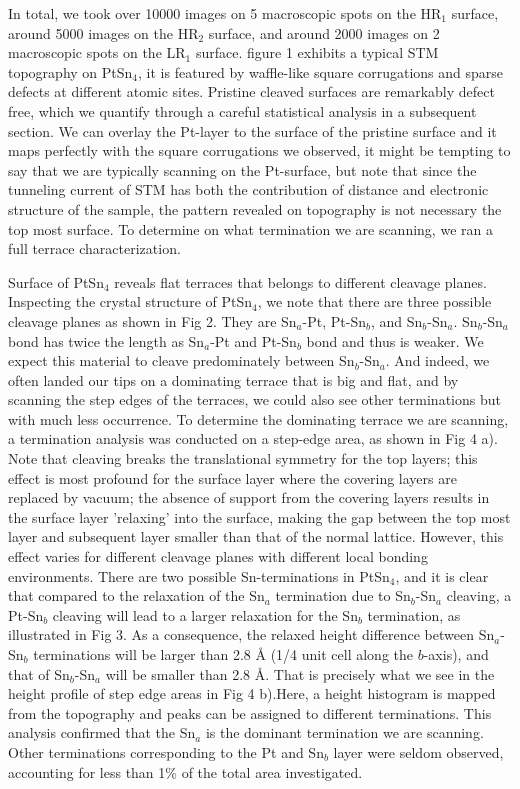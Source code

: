 In total, we took over 10000 images on 5 macroscopic spots on the HR$_1$ surface, around 5000 images on the HR$_2$ surface, and around 2000 images on 2 macroscopic spots on the LR$_1$ surface. 
figure 1 exhibits a typical STM topography on PtSn$_4$, it is featured by waffle-like square corrugations and sparse defects at different atomic sites. Pristine cleaved surfaces are remarkably defect free, which we quantify through a careful statistical analysis in a subsequent section. We can overlay the Pt-layer to the surface of the pristine surface and it maps perfectly with the square corrugations we observed, it might be tempting to say that we are typically scanning on the Pt-surface, but note that since the tunneling current of STM has both the contribution of distance and electronic structure of the sample, the pattern revealed on topography is not necessary the top most surface. To determine on what termination we are scanning, we ran a full terrace characterization.    

Surface of PtSn$_4$ reveals flat terraces that belongs to different cleavage planes. Inspecting the crystal structure of PtSn$_4$, we note that there are three possible cleavage planes as shown in Fig 2. They are Sn$_a$-Pt, Pt-Sn$_b$, and Sn$_b$-Sn$_a$. Sn$_b$-Sn$_a$ bond has twice the length as Sn$_a$-Pt and Pt-Sn$_b$ bond and thus is weaker. We expect this material to cleave predominately between Sn$_b$-Sn$_a$. And indeed, we often landed our tips on a dominating terrace that is big and flat, and by scanning the step edges of the terraces, we could also see other terminations but with much less occurrence. To determine the dominating terrace we are scanning, a termination analysis was conducted on a step-edge area, as shown in Fig 4 a). Note that cleaving breaks the translational symmetry for the top layers; this effect is most profound for the surface layer where the covering layers are replaced by vacuum; the absence of support from the covering layers results in the surface layer 'relaxing' into the surface, making the gap between the top most layer and subsequent layer smaller than that of the normal lattice. However, this effect varies for different cleavage planes with different local bonding environments. There are two possible Sn-terminations in PtSn$_4$, and it is clear that compared to the relaxation of the Sn$_a$ termination due to Sn$_b$-Sn$_a$ cleaving, a Pt-Sn$_b$ cleaving will lead to a larger relaxation for the Sn$_b$ termination, as illustrated in Fig 3. As a consequence, the relaxed height difference between Sn$_a$-Sn$_b$ terminations will be larger than 2.8 {\AA} (1/4 unit cell along the $b$-axis), and that of Sn$_b$-Sn$_a$ will be smaller than 2.8 {\AA}. That is precisely what we see in the height profile of step edge areas in Fig 4 b).Here, a height histogram is mapped from the topography and peaks can be assigned to different terminations. This analysis confirmed that the Sn$_a$ is the dominant termination we are scanning. Other terminations corresponding to the Pt and Sn$_b$ layer were seldom observed, accounting for less than 1\% of the total area investigated. 

